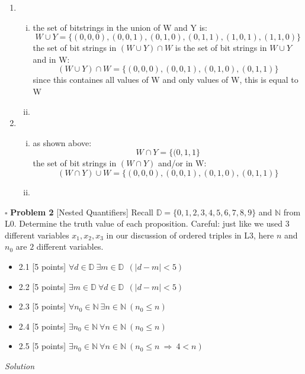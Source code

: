 \documentclass[11pt,twoside]{amsart}
\begin{document}
\begin{enumerate}[1.]
     \item
        \begin{enumerate}[i)]
           \item
             the set of bitstrings in the union of W and Y is:
             $$W\cup Y = \{ (0,0,0), (0,0,1), (0,1,0), (0,1,1), (1,0,1), (1,1,0)\}$$
             the set of bit strings in $(W\cup Y) \cap W$ is the set of bit strings in $W \cup Y$ and in W:
             $$(W \cup Y)\cap W = \{ (0,0,0), (0,0,1), (0,1,0),(0,1,1)\}$$
             since this containes all values of W and only values of W, this is equal to W
    \begin{center}  \end{center}

           \item
             \bigskip
         \end{enumerate}
     \item
        \begin{enumerate}[i)]
           \item
             as shown above:
             $$W \cap Y = \{(0,1,1\}$$
             the set of bit strings in $(W \cap Y)$ and/or in W:
             $$(W \cap Y)\cup W = \{ (0,0,0), (0,0,1), (0,1,0), (0,1,1) \}$$
             \begin{center}  \end{center}

           \item
             \bigskip
         \end{enumerate}
 \end{enumerate}

\newpage
 \noindent $\square$ \textbf{Problem 2}  [\textsf{Nested Quantifiers}] Recall $\mathbb{D} = \{0,1,2,3,4,5,6,7,8,9\}$ and $\mathbb{N}$ from \textsf{L0}.  Determine the truth value of each proposition.  Careful: just like we used $3$ different variables $x_1, x_2, x_3$ in our discussion of ordered triples in \textsf{L3}, here $n$ and $n_0$ are $2$ different variables. 
  \begin{itemize}
  \itemsep0em 
   \item 2.1 [5 points] $\forall d \in \mathbb{D} \ \exists m \in \mathbb{D} \ \ ( | d - m | < 5)$
   \item 2.2 [5 points] $\exists m \in \mathbb{D} \ \forall d \in \mathbb{D} \  \ (| d - m | < 5)$
      \item 2.3 [5 points] $\forall n_0 \in \mathbb{N} \ \exists n \in \mathbb{N} \  (n_0  \leq n)$
            \item 2.4 [5 points] $\exists n_0 \in \mathbb{N} \ \forall n \in \mathbb{N} \  (n_0 \leq n)$
   \item 2.5 [5 points] $\exists n_0 \in \mathbb{N} \ \forall n \in \mathbb{N} \ ( n_0 \leq n \ \Rightarrow  \ 4<n)$
\end{itemize}
\emph{Solution}
\end{document}
